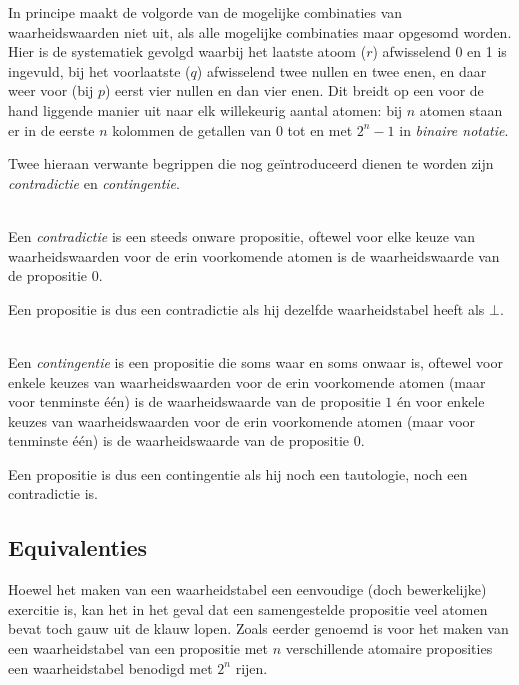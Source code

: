 In principe maakt de volgorde van de mogelijke combinaties van waarheidswaarden niet uit, als alle mogelijke combinaties maar opgesomd worden. Hier is de systematiek gevolgd waarbij het laatste atoom ($r$) afwisselend 0 en 1 is ingevuld, bij het voorlaatste ($q$) afwisselend twee nullen en twee enen, en daar weer voor (bij $p$) eerst vier nullen en dan vier enen. Dit breidt op een voor de hand liggende manier uit naar elk willekeurig aantal atomen: bij $n$ atomen staan er in de eerste $n$ kolommen de getallen van 0 tot en met $2^n-1$ in \textit{binaire notatie}.

Twee hieraan verwante begrippen die nog ge\"introduceerd dienen te worden zijn \textit{contradictie} en \textit{contingentie}.
\begin{definition}[Contradictie]\mbox{}\\
Een \textit{contradictie} is een steeds onware propositie, oftewel voor elke keuze van waarheidswaarden voor de erin voorkomende atomen is de waarheidswaarde van de propositie $0$.
\end{definition}
Een propositie is dus een contradictie als hij dezelfde waarheidstabel heeft als $\bot$.
\begin{definition}[Contingentie]\mbox{}\\
Een \textit{contingentie} is een propositie die soms waar en soms onwaar is, oftewel voor enkele keuzes van waarheidswaarden voor de erin voorkomende atomen (maar voor tenminste \'e\'en) is de waarheidswaarde van de propositie $1$ \'en voor enkele keuzes van waarheidswaarden voor de erin voorkomende atomen (maar voor tenminste \'e\'en) is de waarheidswaarde van de propositie $0$.
\end{definition}
Een propositie is dus een contingentie als hij noch een tautologie, noch een contradictie is.

\subsection{Equivalenties}\label{sec:equiv}
Hoewel het maken van een waarheidstabel een eenvoudige (doch bewerkelijke) exercitie is, kan het in het geval dat een samengestelde propositie veel atomen bevat toch gauw uit de klauw lopen. Zoals eerder genoemd is voor het maken van een waarheidstabel van een propositie met $n$ verschillende atomaire proposities een waarheidstabel benodigd met $2^n$ rijen.

